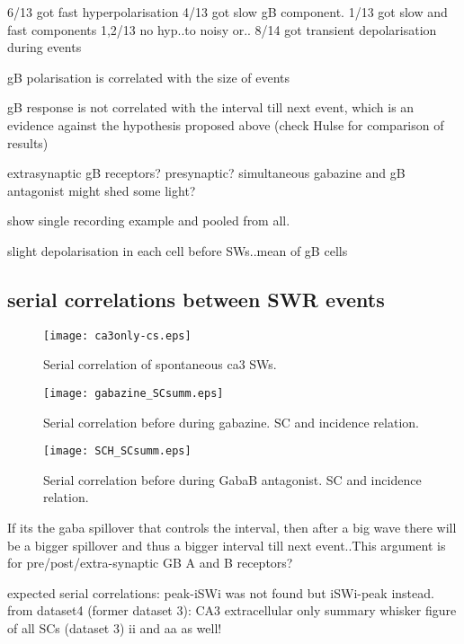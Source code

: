     6/13 got fast hyperpolarisation
    4/13 got slow gB component.
    1/13 got slow and fast components
    1,2/13 no hyp..to noisy or..
    8/14 got transient depolarisation during events 

    gB polarisation is correlated with the size of events

    gB response is not correlated with the interval till next event, which is an evidence against the hypothesis proposed above
    (check Hulse for comparison of results)

    extrasynaptic gB receptors?
    presynaptic?
    simultaneous gabazine and gB antagonist might shed some light?

    show single recording example and pooled from all.

    slight depolarisation in each cell before SWs..mean of gB cells

  \subsection{serial correlations between SWR events}

    \begin{figure}
      \texttt{[image: ca3only-cs.eps]}
      \caption{
        Serial correlation of spontaneous ca3 SWs.
             }
      \label{fig:ca3only_SCsumm}
    \end{figure}

    \begin{figure}
      \texttt{[image: gabazine\_SCsumm.eps]}
      \caption{
        Serial correlation before during gabazine. SC and incidence relation.
             }
      \label{fig:gabazine_SCsumm}
    \end{figure}

    \begin{figure}
      \texttt{[image: SCH\_SCsumm.eps]}
      \caption{
        Serial correlation before during GabaB antagonist. SC and incidence relation.
             }
      \label{fig:SCH_SCsumm}
    \end{figure}

    If its the gaba spillover that controls the interval, then after a big wave
    there will be a bigger spillover and thus a bigger interval till next
    event..This argument is for pre/post/extra-synaptic GB A and B receptors?

    expected serial correlations: peak-iSWi was not found but iSWi-peak instead.
    from dataset4 (former dataset 3): CA3 extracellular only
    summary whisker figure of all SCs (dataset 3) ii and aa as well!


